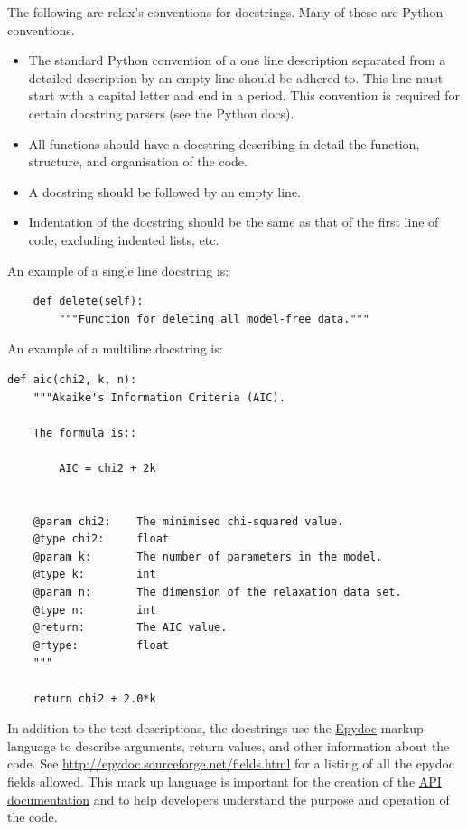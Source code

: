 The following are relax's conventions for docstrings.
Many of these are Python conventions.
\begin{itemize}
  \item The standard Python convention of a one line description separated from a detailed description by an empty line should be adhered to.
    This line must start with a capital letter and end in a period.
    This convention is required for certain docstring parsers (see the Python docs).
  \item All functions should have a docstring describing in detail the function, structure, and organisation of the code.
  \item A docstring should be followed by an empty line.
  \item Indentation of the docstring should be the same as that of the first line of code, excluding indented lists, etc.
\end{itemize}

An example of a single line docstring is:

\begin{lstlisting}
    def delete(self):
        """Function for deleting all model-free data."""
\end{lstlisting}

An example of a multiline docstring is:

\begin{lstlisting}
def aic(chi2, k, n):
    """Akaike's Information Criteria (AIC).

    The formula is::

        AIC = chi2 + 2k


    @param chi2:    The minimised chi-squared value.
    @type chi2:     float
    @param k:       The number of parameters in the model.
    @type k:        int
    @param n:       The dimension of the relaxation data set.
    @type n:        int
    @return:        The AIC value.
    @rtype:         float
    """

    return chi2 + 2.0*k
\end{lstlisting}

In addition to the text descriptions, the docstrings use the \href{http://epydoc.sourceforge.net/}{Epydoc} markup language to describe arguments, return values, and other information about the code.
See \href{http://epydoc.sourceforge.net/fields.html}{http://epydoc.sourceforge.net/fields.html} for a listing of all the epydoc fields allowed.
This mark up language is important for the creation of the \href{http://www.nmr-relax.com/api/}{API documentation} and to help developers understand the purpose and operation of the code.


